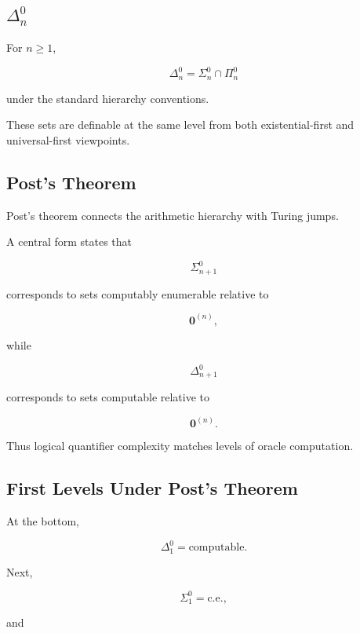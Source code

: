 \subsection{\(\Delta^0_n\)}
\label{subsec:delta-zero-n}

For \(n\geq1\),

\[
\boxed{
\Delta^0_n
=
\Sigma^0_n
\cap
\Pi^0_n
}
\]

under the standard hierarchy conventions.

These sets are definable at the same level from both existential-first and
universal-first viewpoints.

\subsection{Post's Theorem}
\label{subsec:posts-theorem}

Post's theorem connects the arithmetic hierarchy with Turing jumps.

A central form states that

\[
\boxed{
\Sigma^0_{n+1}
}
\]

corresponds to sets computably enumerable relative to

\[
\boxed{
\mathbf{0}^{(n)},
}
\]

while

\[
\boxed{
\Delta^0_{n+1}
}
\]

corresponds to sets computable relative to

\[
\boxed{
\mathbf{0}^{(n)}.
}
\]

Thus logical quantifier complexity matches levels of oracle computation.

\subsection{First Levels Under Post's Theorem}
\label{subsec:posts-theorem-first-levels}

At the bottom,

\[
\boxed{
\Delta^0_1
=
\text{computable}.
}
\]

Next,

\[
\boxed{
\Sigma^0_1
=
\text{c.e.},
}
\]

and

